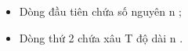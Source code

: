 \begin{itemize}
	\item Dòng đầu tiên chứa số nguyên n ;
	\item Dòng thứ 2 chứa xâu T độ dài n .
\end{itemize}